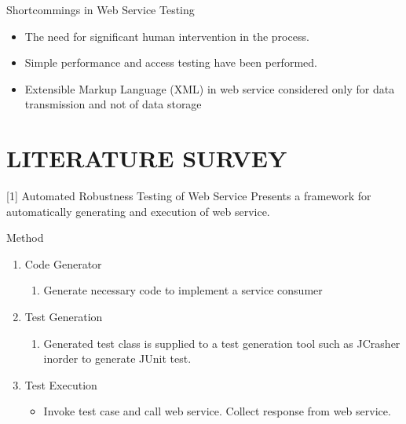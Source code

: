 \documentclass{bredelebeamer}
\begin{document}
\begin{frame}
	\begin{block}{Shortcommings in Web Service Testing}
	\begin{itemize}
		\large
		\item The need
		for significant human intervention in the process.
		\newline
		\item Simple performance
		and access testing have been performed.
		\newline
		\item Extensible Markup Language (XML)
		in web service considered only for data transmission and not of data storage 
	\end{itemize}
	\end{block}
\end{frame}

\section{LITERATURE SURVEY}
\begin{frame}
	
	
\end{frame}


\begin{frame}{[1] Automated Robustness Testing of Web Service}
	Presents a framework for automatically generating and
	execution of web service.
	
	\begin{block}{Method}
		\begin{enumerate}
			\large
			\item Code Generator
			
			\begin{enumerate}
				\large
				\item Generate necessary code to implement a service consumer
				\newline
			\end{enumerate}
			
			\item Test Generation
			
			\begin{enumerate}
				\large
				\item Generated test class is supplied to a test generation tool such as JCrasher inorder to generate JUnit test.
				\newline
			\end{enumerate}		
			
			\item Test Execution
			
			\begin{itemize}
				\large
				\item Invoke test case and call web service.
				Collect response from web service.
				\newline
			\end{itemize}
			
		\end{enumerate}
	\end{block}
	
\end{frame}
\end{document}
